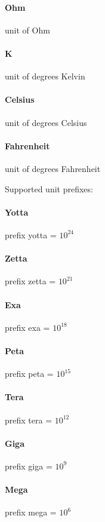 \paragraph{Ohm}
unit of Ohm


\paragraph{K}
unit of degrees Kelvin


\paragraph{Celsius}
unit of degrees Celsius


\paragraph{Fahrenheit}
unit of degrees Fahrenheit


\noindent Supported unit prefixes:

\paragraph{Yotta}
prefix yotta = $10^{24}$


\paragraph{Zetta}
prefix zetta = $10^{21}$


\paragraph{Exa}
prefix exa = $10^{18}$


\paragraph{Peta}
prefix peta = $10^{15}$


\paragraph{Tera}
prefix tera = $10^{12}$


\paragraph{Giga}
prefix giga = $10^9$


\paragraph{Mega}
prefix mega = $10^6$


